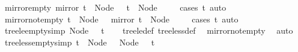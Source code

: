 \begin{isabellebody}
\endisatagproof
{\isafoldproof}%
%
\isadelimproof
\isanewline
%
\endisadelimproof
\isanewline
{}\isamarkupfalse%
\ mirror{\isacharunderscore}{\kern0pt}empty{\isacharcolon}{\kern0pt}\ {\isachardoublequoteopen}mirror\ t\ {\isacharequal}{\kern0pt}\ Node\ {\isacharbrackleft}{\kern0pt}{\isacharbrackright}{\kern0pt}\ {\isasymLongrightarrow}\ t\ {\isacharequal}{\kern0pt}\ Node\ {\isacharbrackleft}{\kern0pt}{\isacharbrackright}{\kern0pt}{\isachardoublequoteclose}\isanewline
%
\isadelimproof
\ \ %
\endisadelimproof
%
\isatagproof
{}\isamarkupfalse%
\ {\isacharparenleft}{\kern0pt}cases\ t{\isacharparenright}{\kern0pt}\ auto%
\endisatagproof
{\isafoldproof}%
%
\isadelimproof
\isanewline
%
\endisadelimproof
\isanewline
{}\isamarkupfalse%
\ mirror{\isacharunderscore}{\kern0pt}not{\isacharunderscore}{\kern0pt}empty{\isacharcolon}{\kern0pt}\ {\isachardoublequoteopen}t\ {\isasymnoteq}\ Node\ {\isacharbrackleft}{\kern0pt}{\isacharbrackright}{\kern0pt}\ {\isasymLongrightarrow}\ mirror\ t\ {\isasymnoteq}\ Node\ {\isacharbrackleft}{\kern0pt}{\isacharbrackright}{\kern0pt}{\isachardoublequoteclose}\isanewline
%
\isadelimproof
\ \ %
\endisadelimproof
%
\isatagproof
{}\isamarkupfalse%
\ {\isacharparenleft}{\kern0pt}cases\ t{\isacharparenright}{\kern0pt}\ auto%
\endisatagproof
{\isafoldproof}%
%
\isadelimproof
\isanewline
%
\endisadelimproof
\isanewline
{}\isamarkupfalse%
\ tree{\isacharunderscore}{\kern0pt}le{\isacharunderscore}{\kern0pt}empty{\isacharbrackleft}{\kern0pt}simp{\isacharbrackright}{\kern0pt}{\isacharcolon}{\kern0pt}\ {\isachardoublequoteopen}Node\ {\isacharbrackleft}{\kern0pt}{\isacharbrackright}{\kern0pt}\ {\isasymle}\ t{\isachardoublequoteclose}\isanewline
%
\isadelimproof
\ \ %
\endisadelimproof
%
\isatagproof
{}\isamarkupfalse%
\ tree{\isacharunderscore}{\kern0pt}le{\isacharunderscore}{\kern0pt}def\ tree{\isacharunderscore}{\kern0pt}less{\isacharunderscore}{\kern0pt}def\ \isamarkupfalse%
\ mirror{\isacharunderscore}{\kern0pt}not{\isacharunderscore}{\kern0pt}empty\ \isamarkupfalse%
\ auto%
\endisatagproof
{\isafoldproof}%
%
\isadelimproof
\isanewline
%
\endisadelimproof
\isanewline
{}\isamarkupfalse%
\ tree{\isacharunderscore}{\kern0pt}less{\isacharunderscore}{\kern0pt}empty{\isacharbrackleft}{\kern0pt}simp{\isacharbrackright}{\kern0pt}{\isacharcolon}{\kern0pt}\ {\isachardoublequoteopen}t\ {\isasymnoteq}\ Node\ {\isacharbrackleft}{\kern0pt}{\isacharbrackright}{\kern0pt}\ {\isasymLongrightarrow}\ Node\ {\isacharbrackleft}{\kern0pt}{\isacharbrackright}{\kern0pt}\ {\isacharless}{\kern0pt}\ t{\isachardoublequoteclose}\isanewline

\end{isabellebody}
